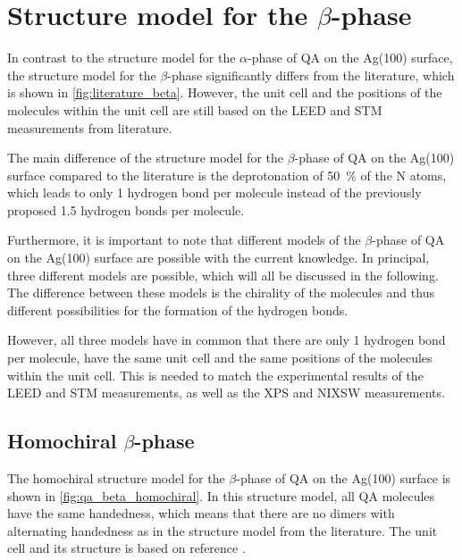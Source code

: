\newpage
\section{Structure model for the \texorpdfstring{$\beta$}{beta}-phase}

In contrast to the structure model for the $\alpha$-phase of \ac{QA} on the Ag(100) surface, the structure model for the $\beta$-phase significantly differs from the literature, which is shown in \autoref{fig:literature_beta}. However, the unit cell and the positions of the molecules within the unit cell are still based on the \ac{LEED} and \ac{STM} measurements from literature.\autocite{Humberg2020} 

The main difference of the structure model for the $\beta$-phase of \ac{QA} on the Ag(100) surface compared to the literature is the deprotonation of 50~\% of the N atoms, which leads to only 1 hydrogen bond per molecule instead of the previously proposed 1.5 hydrogen bonds per molecule.

Furthermore, it is important to note that different models of the $\beta$-phase of \ac{QA} on the Ag(100) surface are possible with the current knowledge. In principal, three different models are possible, which will all be discussed in the following. The difference between these models is the chirality of the molecules and thus different possibilities for the formation of the hydrogen bonds.

However, all three models have in common that there are only 1 hydrogen bond per molecule, have the same unit cell and the same positions of the molecules within the unit cell. This is needed to match the experimental results of the \ac{LEED} and \ac{STM} measurements, as well as the \ac{XPS} and \ac{NIXSW} measurements.


\subsection{Homochiral \texorpdfstring{$\beta$}{beta}-phase}

The homochiral structure model for the $\beta$-phase of \ac{QA} on the Ag(100) surface is shown in \autoref{fig:qa_beta_homochiral}. In this structure model, all \ac{QA} molecules have the same handedness, which means that there are no dimers with alternating handedness as in the structure model from the literature. The unit cell and its structure is based on reference \cite{Humberg2020}.

